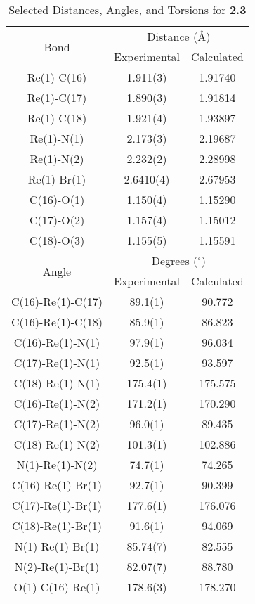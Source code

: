 \begin{table}[htbp]
  \caption{Selected Distances, Angles, and Torsions for \textbf{2.3}}
  \centering
    \begin{tabular}{ccc}
    \toprule
   \multirow{2}{*}{Bond} & \multicolumn{2}{c}{Distance (\r{A})} \\ \cline{2-3}
     & Experimental & Calculated \\ \midrule
    Re(1)-C(16) & 1.911(3) & 1.91740 \\
    Re(1)-C(17) & 1.890(3) & 1.91814 \\
    Re(1)-C(18) & 1.921(4) & 1.93897 \\
    Re(1)-N(1) & 2.173(3) & 2.19687 \\
    Re(1)-N(2) & 2.232(2) & 2.28998 \\
    Re(1)-Br(1) & 2.6410(4) & 2.67953 \\ 
    C(16)-O(1) & 1.150(4) & 1.15290 \\
    C(17)-O(2) & 1.157(4) & 1.15012 \\
    C(18)-O(3) & 1.155(5) & 1.15591 \\ \midrule
    \multirow{2}{*}{Angle} & \multicolumn{2}{c}{Degrees ($^\circ$)} \\ \cline{2-3}
     & Experimental & Calculated \\ \midrule
    C(16)-Re(1)-C(17) & 89.1(1) & 90.772 \\
    C(16)-Re(1)-C(18) & 85.9(1) & 86.823 \\
    C(16)-Re(1)-N(1) & 97.9(1) & 96.034 \\
    C(17)-Re(1)-N(1) & 92.5(1) & 93.597 \\
    C(18)-Re(1)-N(1) & 175.4(1) & 175.575 \\
    C(16)-Re(1)-N(2) & 171.2(1) & 170.290 \\
    C(17)-Re(1)-N(2) & 96.0(1) & 89.435 \\
    C(18)-Re(1)-N(2) & 101.3(1) & 102.886 \\
    N(1)-Re(1)-N(2) & 74.7(1) & 74.265 \\
    C(16)-Re(1)-Br(1) & 92.7(1) & 90.399 \\
    C(17)-Re(1)-Br(1) & 177.6(1) & 176.076 \\
    C(18)-Re(1)-Br(1) & 91.6(1) & 94.069 \\
    N(1)-Re(1)-Br(1) & 85.74(7) & 82.555 \\
    N(2)-Re(1)-Br(1) & 82.07(7) & 88.780 \\
    O(1)-C(16)-Re(1) & 178.6(3) & 178.270 \\

\end{tabular}
\end{table}
